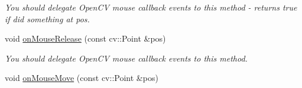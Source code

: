 \begin{DoxyCompactItemize}
\begin{DoxyCompactList}\small\item\em You should delegate Open\+CV mouse callback events to this method -\/ returns true if did something at pos. \end{DoxyCompactList}\item 
void \hyperlink{classcanvascv_1_1Canvas_aca936fe492da286d5fb8eabbcd061793}{on\+Mouse\+Release} (const cv\+::\+Point \&pos)\hypertarget{classcanvascv_1_1Canvas_aca936fe492da286d5fb8eabbcd061793}{}\label{classcanvascv_1_1Canvas_aca936fe492da286d5fb8eabbcd061793}

\begin{DoxyCompactList}\small\item\em You should delegate Open\+CV mouse callback events to this method. \end{DoxyCompactList}\item 
void \hyperlink{classcanvascv_1_1Canvas_a1189823898c4022fd0eed4cfb99535c2}{on\+Mouse\+Move} (const cv\+::\+Point \&pos)\hypertarget{classcanvascv_1_1Canvas_a1189823898c4022fd0eed4cfb99535c2}{}\label{classcanvascv_1_1Canvas_a1189823898c4022fd0eed4cfb99535c2}


\end{DoxyCompactItemize}
